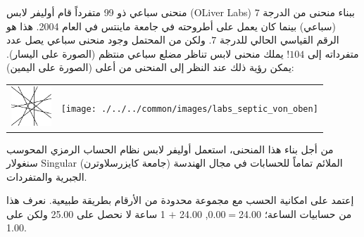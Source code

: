 \begin{surferPage}{منحنى سباعي ذو 99 متفرداً}
      قام أوليفر لابس
      \textenglish{(OLiver Labs)}
       ببناء منحنى من الدرجة $7$ (سباعي) بينما كان يعمل على أطروحته في جامعة ماينتس في العام 2004. هذا هو الرقم القياسي الحالي للدرجة $7$. ولكن من المحتمل وجود منحنى سباعي يصل عدد متفرداته إلى $104$!  
    يملك منحنى لابس تناظر مضلع سباعي منتظم (الصورة على اليسار). يمكن رؤية ذلك عند النظر إلى المنحنى من أعلى (الصورة على اليمين):

    \vspace*{-0.3em}
    \begin{center}
      \begin{tabular}{c@{\qquad}c}
        \includegraphics[height=1.5cm]{./../../common/images/labsseptic1.pdf}
        &
        \texttt{[image: ./../../common/images/labs\_septic\_von\_oben]}
      \end{tabular}
    \end{center}
    \vspace*{-0.3em}

    من أجل بناء هذا المنحنى، استعمل أوليفر لابس نظام الحساب الرمزي المحوسب سنغولار {\sc Singular} (جامعة كايزرسلاوترن) الملائم تماماً للحسابات في مجال الهندسة الجبرية والمتفردات.
   
    إعتمد على امكانية الحسب مع مجموعة محدودة من الأرقام بطريقة طبيعية. نعرف هذا من حسابيات الساعة؛ 24.00$=$0.00, 24.00 $+$ 1 ساعة لا نحصل على 25.00 ولكن على 1.00.
\end{surferPage}
